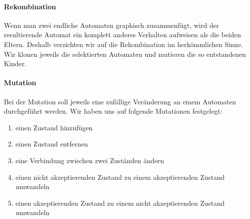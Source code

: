 \paragraph{Rekombination}
Wenn man zwei endliche Automaten graphisch zusammenfügt, wird der resultierende Automat ein komplett anderes Verhalten aufweisen als die beiden Eltern. Deshalb verzichten wir auf die Rekombination im herkömmlichen Sinne. Wir klonen jeweils die selektierten Automaten und mutieren die so entstandenen Kinder.

\paragraph{Mutation}
Bei der Mutation soll jeweils eine zufällige Veränderung an einem Automaten durchgeführt werden. Wir haben uns auf folgende Mutationen festgelegt:
\begin{enumerate}
	\item einen Zustand hinzufügen
	\item einen Zustand entfernen
	\item eine Verbindung zwischen zwei Zuständen ändern
	\item einen nicht akzeptierenden Zustand zu einem akzeptierenden Zustand umwandeln
	\item einen akzeptierenden Zustand zu einem nicht akzeptierenden Zustand umwandeln
\end{enumerate}